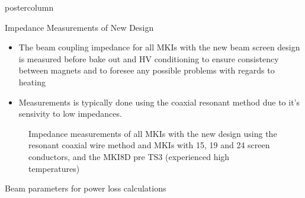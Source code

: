 \documentclass[final,hyperref={pdfpagelabels=false}]{beamer}
\newlength{\columnheight}
\begin{document}
\begin{frame}
\begin{columns}
    \begin{column}{.49\textwidth}
      \begin{beamercolorbox}[center,wd=\textwidth]{postercolumn}
        \begin{minipage}[T]{.95\textwidth} %
          \parbox[t][\columnheight]{\textwidth}{ %
\begin{block}{Impedance Measurements of New Design}
\begin{itemize}
\item{The beam coupling impedance for all MKIs with the new beam screen design is measured before bake out and HV conditioning to ensure consistency between magnets and to foresee any possible problems with regards to heating}
\item{Measurements is typically done using the coaxial resonant method due to it's sensivity to low impedances.}
\end{itemize}
\begin{figure}
\caption{\small{Impedance measurements of  all MKIs with the new design using the resonant coaxial wire method and   MKIs with 15, 19 and 24 screen conductors, and the MKI8D pre TS3 (experienced high temperatures)}}
\end{figure}
\begin{table}
\label{tab:beamPar}
\caption{Beam parameters for power loss calculations}

\end{table}
\end{block}}
\end{minipage}
\end{beamercolorbox}
\end{column}
\end{columns}
\end{frame}
\end{document}

